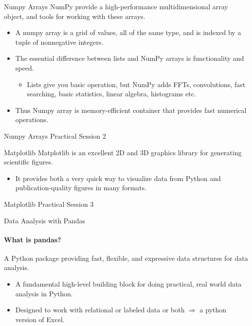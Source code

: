 \documentclass{bredelebeamer}
\begin{document}
\begin{frame}{Numpy Arrays}
NumPy provide a high-performance multidimensional array object, and tools for working with these arrays.
\begin{block}{}
\begin{itemize}
	\item A numpy array is a grid of values, all of the same type, and is indexed by a tuple of nonnegative integers.
	\item The essential difference between lists and NumPy arrays is functionality and speed.
	\begin{itemize} 
	\item Lists give you basic operation, but NumPy adds FFTs, convolutions, fast searching, basic statistics, linear algebra, histograms etc.
    \end{itemize}
    \item Thus Numpy array is memory-efficient container that provides fast numerical operations.
\end{itemize}
\end{block}	
\end{frame}	

\begin{frame}{Numpy Arrays}
\centering
{\LARGE  Practical Session 2}
\end{frame}

\begin{frame}{Matplotlib}
Matplotlib is an excellent 2D and 3D graphics library for generating scientific figures.\\
 \begin{itemize}
 	\item It provides both a very quick way to visualize data from Python and publication-quality figures in many formats.
 \end{itemize}
\end{frame}


\begin{frame}{Matplotlib}
\centering
{\LARGE  Practical Session 3}
\end{frame}



\begin{frame}{Data Analysis with Pandas}
\framesubtitle{What is pandas?}
A Python package providing fast, flexible, and expressive data structures for data analysis.
\begin{itemize}
	\item A fundamental high-level building block for doing practical, real world data analysis in Python.
	\item Designed to work with relational or labeled data or both $\Rightarrow$ a python version of Excel.
\end{itemize}	

\end{frame}
\end{document}
